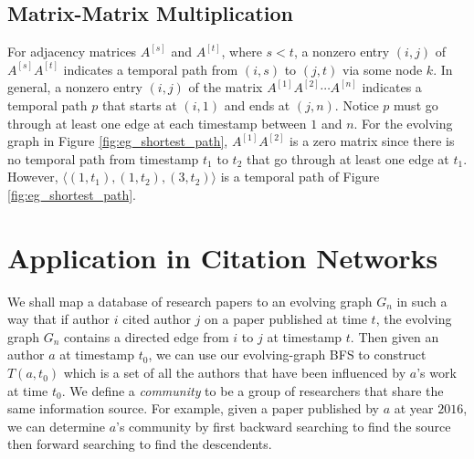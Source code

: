 \documentclass[11pt, conference, , compsocconf]{IEEEtran}
\theoremstyle{definition}
\begin{document}


\subsection{Matrix-Matrix Multiplication}
\label{sec:matr-matr-mult}

For adjacency matrices $A^{[s]}$ and $A^{[t]}$, where $s < t$, a nonzero entry
$(i,j)$ of $A^{[s]} A^{[t]}$ indicates a temporal path from $(i,s)$ to $(j,t)$ via
some node $k$. 
In general, a nonzero entry $(i,j)$ of the matrix $A^{[1]}A^{[2]}\cdots A^{[n]}$ 
indicates a temporal path $p$ that starts at $(i,1)$ and ends at  $(j,n)$. 
Notice $p$ must go through at least one edge at each timestamp between $1$ and $n$.
For the evolving graph in Figure \ref{fig:eg_shortest_path}, $A^{[1]}A^{[2]}$
is a zero matrix since there is no temporal path from timestamp $t_1$ to $t_2$ that
go through at least one edge at $t_1$. However, 
$\langle(1, t_1), (1, t_2), (3,t_2)\rangle$ is a temporal path of Figure \ref{fig:eg_shortest_path}.
 

\section{Application in Citation Networks}
\label{sec:applications}

We shall map a database of research papers to an evolving graph $G_n$
in such a way that if author $i$ cited author $j$ on a paper published
at  time $t$, the evolving graph $G_n$ contains a directed edge from
$i$ to $j$ at timestamp $t$. Then given an author $a$ at timestamp $t_0$,
we can use our evolving-graph BFS to construct $T(a, t_0)$ which is 
a set of all the authors that have been influenced by $a$'s work at  
time $t_0$. We define a \emph{community} to be a group of 
researchers that share the same information source. 
For example, given a paper published by $a$ at year $2016$, 
we can determine $a$'s community by first backward searching to 
find the source then forward searching to find the descendents.
\end{document}

